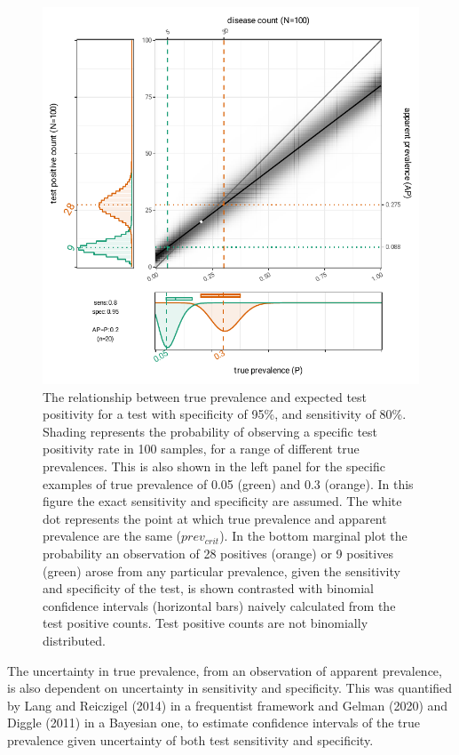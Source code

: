 \documentclass[a4paper, 12pt, twoside]{article}
\begin{document}
\begin{figure}[hb!]
\centering
  \includegraphics{fig/rogan-gladen-v3}
  \caption{The relationship between true prevalence and expected test positivity for a test with specificity of 95\%, and sensitivity of 80\%. Shading represents the probability of observing a specific test positivity rate in 100 samples, for a range of different true prevalences. This is also shown in the left panel for the specific examples of true prevalence of 0.05 (green) and 0.3 (orange). In this figure the exact sensitivity and specificity are assumed. The white dot represents the point at which true prevalence and apparent prevalence are the same (\(prev_{crit}\)). In the bottom marginal plot the probability an observation of 28 positives (orange) or 9 positives (green) arose from any particular prevalence, given the sensitivity and specificity of the test, is shown contrasted with binomial confidence intervals (horizontal bars) naively calculated from the test positive counts. Test positive counts are not binomially distributed.}
\label{fig:B1}
\end{figure}

The uncertainty in true prevalence, from an observation of apparent prevalence, is also dependent on uncertainty in sensitivity and specificity. This was quantified by Lang and Reiczigel (2014)\cite{lang2014,flor2020} in a frequentist framework and Gelman (2020) and Diggle (2011) \cite{gelman2020,flor2020,diggle2011} in a Bayesian one, to estimate confidence intervals of the true prevalence given uncertainty of both test sensitivity and specificity.
\end{document}
